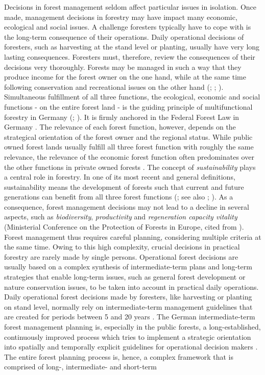 Decisions in forest management seldom affect particular issues in isolation. Once made, management decisions in forestry may have impact many economic, ecological and social issues. A challenge foresters typically have to cope with is the long-term consequence of their operations. Daily operational decisions of foresters, such as harvesting at the stand level or planting, usually have very long lasting consequences. Foresters must, therefore, review the consequences of their decisions very thoroughly. Forests may be managed in such a way that they produce income for the forest owner on the one hand, while at the same time following conservation and recreational issues on the other hand (\citealp[p. 11]{kangas_2015}; \citealp[p. 67]{mohring_1997}; \citealp[p. 100]{spellmann_2010}). Simultaneous fulfillment of all three functions, the ecological, economic and social functions - on the entire forest land - is the guiding principle of multifunctional forestry in Germany (\citealp[p. 75]{mohring_2010b}; \citealp[p. 100]{spellmann_2010}). It is firmly anchored in the Federal Forest Law in Germany \citep[p. 457]{moller_2007}. The relevance of each forest function, however, depends on the strategical orientation of the forest owner and the regional status. While public owned forest lands usually fulfill all three forest function with roughly the same relevance, the relevance of the economic forest function often predominates over the other functions in private owned forests \citep[p. 76-77]{mohring_2010b}. The concept of \textit{sustainability} plays a central role in forestry. In one of its most recent and general definitions, sustainability means the development of forests such that current and future generations can benefit from all three forest functions (\citealp[p. 14]{un_2005}; see also \citealp[p. 14]{kangas_2015}; \citealp[p. 100-101]{spellmann_2010}). As a consequence, forest management decisions may not lead to a decline in several aspects, such as \textit{biodiversity}, \textit{productivity} and \textit{regeneration capacity vitality} (Ministerial Conference on the Protection of Forests in Europe, cited from \citealp[p. 15]{kangas_2015}). Forest management thus requires careful planning, considering multiple criteria at the same time. Owing to this high complexity, crucial decisions in practical forestry are rarely made by single persons. Operational forest decisions are usually based on a complex synthesis of intermediate-term plans and long-term strategies that enable long-term issues, such as general forest development or nature conservation issues, to be taken into account in practical daily operations. Daily operational forest decisions made by foresters, like harvesting or planting on stand level, normally rely on intermediate-term management guidelines that are created for periods between 5 and 20 years \citep[p. 12]{kangas_2015}. The German intermediate-term forest management planning is, especially in the public forests, a long-established, continuously improved process which tries to implement a strategic orientation into spatially and temporally explicit guidelines for operational decision makers \citep[p. 156-158]{bockmann_2004}. The entire forest planning process is, hence, a complex framework that is comprised of long-, intermediate- and short-term 